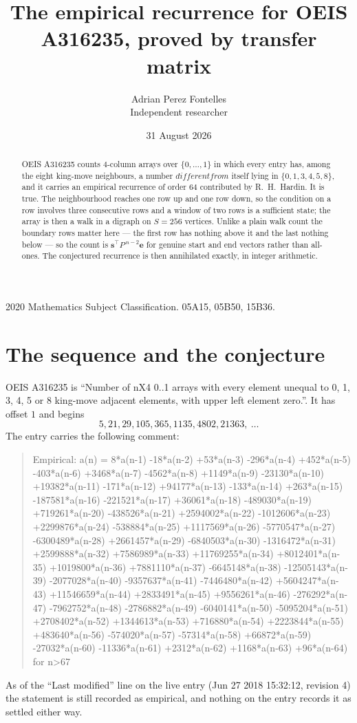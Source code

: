 \documentclass[11pt,a4paper]{article}
\title{The empirical recurrence for OEIS A316235, proved by transfer matrix}
\author{Adrian Perez Fontelles\\ \small Independent researcher}
\date{31 August 2026}
\theoremstyle{plain}
\theoremstyle{definition}
\begin{document}
\maketitle

\begin{abstract}
OEIS A316235 counts $4$-column arrays over $\{0,\dots,1\}$ in which every entry has,
among the eight king-move neighbours, a number $different from$ itself lying in $\{0,1,3,4,5,8\}$, and it carries an empirical
recurrence of order $64$ contributed by R.~H.~Hardin. It is true. The neighbourhood
reaches one row up and one row down, so the condition on a row involves three consecutive
rows and a window of two rows is a sufficient state; the array is then a walk in a digraph
on $S=256$ vertices. Unlike a plain walk count the boundary rows matter here --- the first
row has nothing above it and the last nothing below --- so the count is
$\mathbf{s}^{\!\top}P^{\,n-2}\mathbf{e}$ for genuine start and end vectors rather than
all-ones. The conjectured recurrence is then annihilated exactly, in integer arithmetic.
\end{abstract}

\noindent\small 2020 Mathematics Subject Classification. 05A15, 05B50, 15B36.\normalsize

\section{The sequence and the conjecture}

OEIS A316235 is ``Number of nX4 0..1 arrays with every element unequal to 0, 1, 3, 4, 5 or 8 king-move adjacent elements, with upper left element zero.''. It has offset
$1$ and begins
\[
5, 21, 29, 105, 365, 1135, 4802, 21363,\ \dots
\]
The entry carries the following comment:
\begin{quote}\small
Empirical: a(n) = 8*a(n-1) -18*a(n-2) +53*a(n-3) -296*a(n-4) +452*a(n-5) -403*a(n-6) +3468*a(n-7) -4562*a(n-8) +1149*a(n-9) -23130*a(n-10) +19382*a(n-11) -171*a(n-12) +94177*a(n-13) -133*a(n-14) +263*a(n-15) -187581*a(n-16) -221521*a(n-17) +36061*a(n-18) -489030*a(n-19) +719261*a(n-20) -438526*a(n-21) +2594002*a(n-22) -1012606*a(n-23) +2299876*a(n-24) -538884*a(n-25) +1117569*a(n-26) -5770547*a(n-27) -6300489*a(n-28) +2661457*a(n-29) -6840503*a(n-30) -1316472*a(n-31) +2599888*a(n-32) +7586989*a(n-33) +11769255*a(n-34) +8012401*a(n-35) +1019800*a(n-36) +7881110*a(n-37) -6645148*a(n-38) -12505143*a(n-39) -2077028*a(n-40) -9357637*a(n-41) -7446480*a(n-42) +5604247*a(n-43) +11546659*a(n-44) +2833491*a(n-45) +9556261*a(n-46) -276292*a(n-47) -7962752*a(n-48) -2786882*a(n-49) -6040141*a(n-50) -5095204*a(n-51) +2708402*a(n-52) +1344613*a(n-53) +716880*a(n-54) +2223844*a(n-55) +483640*a(n-56) -574020*a(n-57) -57314*a(n-58) +66872*a(n-59) -27032*a(n-60) -11336*a(n-61) +2312*a(n-62) +1168*a(n-63) +96*a(n-64) for n>67
\end{quote}
As of the ``Last modified'' line on the live entry (Jun 27 2018 15:32:12, revision
4) the statement is still recorded as empirical, and nothing on the entry
records it as settled either way.
\end{document}
